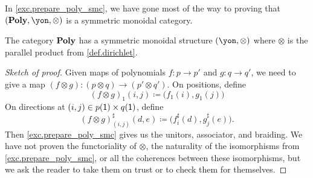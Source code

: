 \documentclass[Book-Poly]{subfiles}
\begin{document}
In \cref{exc.prepare_poly_smc}, we have gone most of the way to proving that $(\poly,\yon,\otimes)$ is a symmetric monoidal category. 

\begin{proposition}\label{prop.dirichlet_monoidal}
The category $\mathbf{Poly}$ has a symmetric monoidal structure $(\yon,\otimes)$ where $\otimes$ is the parallel product from \cref{def.dirichlet}.
\end{proposition}
\begin{proof}[Sketch of proof]
Given maps of polynomials $f\colon p\to p'$ and $g\colon q\to q'$, we need to give a map $(f\otimes g)\colon (p\otimes q)\to (p'\otimes q')$. On positions, define
\[
(f\otimes g)_1(i,j)\coloneqq \big(f_1(i),g_1(j)\big)
\]
On directions at $(i,j)\in p(\textsf{1})\times q(\textsf{1})$, define
\[
  (f\otimes g)^\sharp_{(i,j)}(d,e)\coloneqq
  \big(f^\sharp_i(d),g^\sharp_j(e)\big).
\]
Then \cref{exc.prepare_poly_smc} gives us the unitors, associator, and braiding.
We have not proven the functoriality of $\otimes$, the naturality of the isomorphisms from \cref{exc.prepare_poly_smc}, or all the coherences between these isomorphisms, but we ask the reader to take them on trust or to check them for themselves. 
\end{proof}
\end{document}
